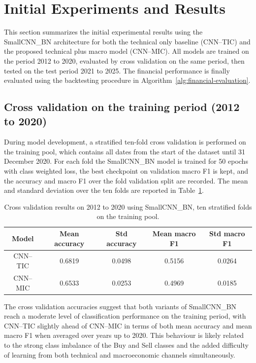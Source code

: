 \documentclass[12pt,a4paper]{article}
\begin{document}
\section{Initial Experiments and Results}
\label{subsec:initial-results}
This section summarizes the initial experimental results using the SmallCNN\_BN architecture for both the technical only baseline (CNN--TIC) and the proposed technical plus macro model (CNN--MIC). All models are trained on the period 2012 to 2020, evaluated by cross validation on the same period, then tested on the test period 2021 to 2025. The financial performance is finally evaluated using the backtesting procedure in Algorithm~\ref{alg:financial-evaluation}.

\subsection{Cross validation on the training period (2012 to 2020)}

 During model development, a stratified ten-fold cross validation is performed on the training pool, which contains all dates from the start of the dataset until 31 December 2020. For each fold the SmallCNN\_BN model is trained for 50 epochs with class weighted loss, the best checkpoint on validation macro F1 is kept, and the accuracy and macro F1 over the fold validation split are recorded. The mean and standard deviation over the ten folds are reported in Table~\ref{tab:cv-smallcnn-bn}.

\begin{table}[H]
	\centering
	\caption{Cross validation results on 2012 to 2020 using SmallCNN\_BN, ten stratified folds on the training pool.}
	\label{tab:cv-smallcnn-bn}
	\small
	\begin{tabular}{|c|c|c|c|c|}
		\hline
		Model & Mean accuracy & Std accuracy & Mean macro F1 & Std macro F1 \\
		\hline
		CNN--TIC & 0.6819 & 0.0498 & 0.5156 & 0.0264 \\
		\hline
		CNN--MIC & 0.6533 & 0.0253 & 0.4969 & 0.0185 \\
		\hline
	\end{tabular}
\end{table}


The cross validation accuracies suggest that both variants of SmallCNN\_BN reach a moderate level of classification performance on the training period, with CNN--TIC slightly ahead of CNN--MIC in terms of both mean accuracy and mean macro F1 when averaged over years up to 2020. This behaviour is likely related to the strong class imbalance of the Buy and Sell classes and the added difficulty of learning from both technical and macroeconomic channels simultaneously.
\end{document}
